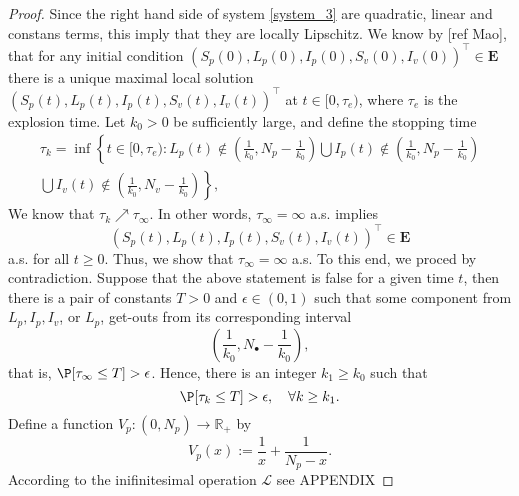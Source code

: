\begin{proof}
		Since the right hand side of system \eqref{system_3} are quadratic, 
	linear and constans terms, this imply that they are locally Lipschitz. We 
	know by [ref Mao], that for any initial condition
	$
		(S_p(0), L_p(0), I_p(0), S_v (0), I_v(0))^{\top}\in \mathbf{E}
	$ 
	there is a unique maximal local solution 
	$(S_p(t), L_p(t), I_p(t), S_v(t), I_v(t))^{\top}$ 
	at $t\in [0,\tau_e)$, where 
	$\tau_e$ is the explosion time. Let $k_0>0$ be sufficiently large, and 
	define the stopping time
	\begin{multline}
		\label{eqn:invariatn_set}
		\tau_k = %
			\inf
			\left\{
				t \in [0,\tau_e)
				: 
				L_p(t) \notin 
					\left(
						\frac{1}{k_0},
					 N_p - \frac{1}{k_0}
					\right)		
			 \bigcup 
				I_p(t)
				\notin
				\left(
					\frac{1}{k_0}, 
					N_p-\frac{1}{k_0}
				\right)
			\right.
			\\
			\bigcup
			\left.		
					I_v(t) 
					\notin
					\left(
						\frac{1}{k_0},
						N_v - \frac{1}{k_0}
					\right)
			\right\},
		\end{multline}
%	
	We know that $\tau_k \nearrow \tau_\infty$. 
	In other words, $\tau_\infty = \infty$ a.s. 
	implies
	\begin{equation}
		\label{eqn:invariance_prop}
		(
			S_p(t),
			L_p(t),
			I_p(t),
			S_v(t),
			I_v(t)
		)^{\top}\in \mathbf{E}
	\end{equation}
	 a.s. for all $t\geq 0$. Thus, 
	we  show that $\tau_\infty=\infty$ a.s. To this end,  we proced
	by contradiction. Suppose that the above statement is false for a given time $t$, then there is 
	a pair of constants $T>0$ and $\epsilon  \in (0,1)$  such that some component from $L_p,I_p,I_v$, or $L_p$, get-outs from its corresponding 
	interval
	$$
	\left(
		\frac{1}{k_0}, 
	N_{\bullet} - \frac{1}{k_0}
	\right), 
	$$
	that is, %
	$
		\P[\tau_\infty\leq T]>\epsilon 
	$. 
	Hence, there is an integer $k_1\geq k_0$ such that
%	
	\begin{equation}\label{Positive1}
		\P[\tau_k\leq T]>\epsilon,
		\quad \forall k\geq k_1.
	\end{equation}
	Define a function $V_p:(0,N_p)\rightarrow \mathbb{R}_+$ by
%	
	\begin{equation*}
		V_p(x) := 
			\frac{1}{x} + 
			\frac{1}{N_p-x}.
	\end{equation*}
%	
	According to the inifinitesimal operation $\mathcal{L}$
	see APPENDIX

\end{proof}
